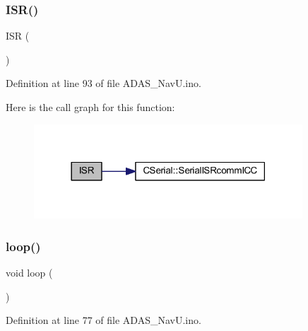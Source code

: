 \subsubsection{\texorpdfstring{I\+S\+R()}{ISR()}\hspace{0.1cm}{\footnotesize\ttfamily [2/2]}}
{\footnotesize\ttfamily I\+SR (\begin{DoxyParamCaption}\item[{U\+S\+A\+R\+T2\+\_\+\+R\+X\+\_\+vect}]{ }\end{DoxyParamCaption})}



Definition at line 93 of file A\+D\+A\+S\+\_\+\+Nav\+U.\+ino.

Here is the call graph for this function\+:\nopagebreak
\begin{figure}[H]
\begin{center}
\leavevmode
\includegraphics[width=285pt]{_a_d_a_s___nav_u_8ino_a63a86aad9ba2e355fe6380da553f554e_cgraph}
\end{center}
\end{figure}
\mbox{\label{_a_d_a_s___nav_u_8ino_afe461d27b9c48d5921c00d521181f12f}} 
\subsubsection{\texorpdfstring{loop()}{loop()}}
{\footnotesize\ttfamily void loop (\begin{DoxyParamCaption}{ }\end{DoxyParamCaption})}



Definition at line 77 of file A\+D\+A\+S\+\_\+\+Nav\+U.\+ino.

